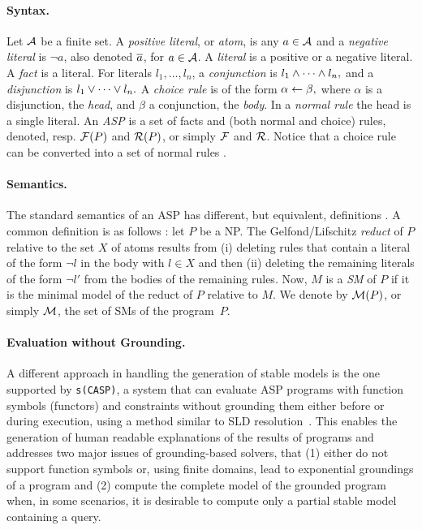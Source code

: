 \documentclass[x11names]{tlp}
\renewcommand{\cite}{\citep}
\begin{document}
\paragraph{Syntax.}
\label{par:syntax}

Let $\ATOMSset$ be a finite set. A \textit{positive literal}, or
\textit{atom}, is any $a \in \ATOMSset$ and a \textit{negative literal} is
$\neg a$, also denoted $\overline{a}$, for $a\in\ATOMSset$. A \textit{literal} is a
positive or a negative literal. A \textit{fact} is a literal. For literals
$l_1, \ldots, l_n$, a \emph{conjunction} is $ l _1 \wedge \cdots \wedge l_n, $
and a \textit{disjunction} is $ l_1 \vee \cdots \vee l_n. $ A
\textit{choice rule} is of the form $ \alpha \leftarrow \beta, $ where $\alpha$
is a disjunction, the \textit{head}, and $\beta$ a conjunction, the
\textit{body}. In a \textit{normal rule} the head is a single literal. An
\textit{\acf{ASP}} is a set of facts and (both normal and choice) rules,
denoted, resp. $\FACTSset\at{P}$ and $\RULESset\at{P}$, or simply $\FACTSset$
and $\RULESset$. Notice that a choice rule can be converted into a set of
normal rules \cite{gebser2022answer}.

\paragraph{Semantics.}

The standard semantics of an \ac{ASP} has different, but equivalent,
definitions \cite{lifschitz2008twelve}. A common definition is as follows
\cite{gelfond1988stable}: let $P$ be a \acl{NP}. The Gelfond/Lifschitz
\emph{reduct} of $P$ relative to the set $X$ of atoms results from (i)
deleting rules that contain a literal of the form $\neg l$ in the body with
$l \in X$ and then (ii) deleting the remaining literals of the form $\neg l'$
from the bodies of the remaining rules. Now, $M$ is a \textit{\acf{SM}} of
$P$ if it is the minimal model of the reduct of $P$ relative to $M$. We
denote by $\MODELset\at{P}$, or simply $\MODELset$, the set of \aclp{SM} of
the program~$P$.

\paragraph{Evaluation without Grounding.}

A different approach in handling the generation of stable models is the one
supported by \texttt{s(CASP)}, a system that can evaluate ASP programs with
function symbols (functors) and constraints without grounding them either
before or during execution, using a method similar to SLD
resolution~\cite{marple2017computing,arias2020justifications}. This enables
the generation of human readable explanations of the results of programs and
addresses two major issues of grounding-based solvers, that (1) either do not
support function symbols or, using finite domains, lead to exponential
groundings of a program and (2) compute the complete model of the grounded
program when, in some scenarios, it is desirable to compute only a partial
stable model containing a query.%
\end{document}
